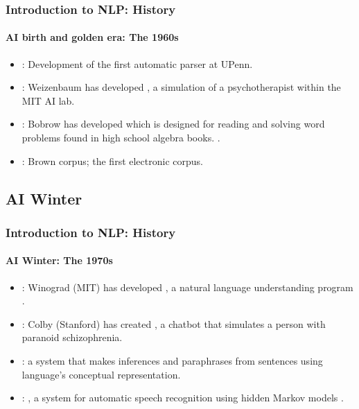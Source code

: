 \documentclass[xcolor=table]{beamer}
\begin{document}
\begin{frame}
\frametitle{Introduction to NLP: History}
\framesubtitle{AI birth and golden era: The 1960s}

\begin{itemize}
	\item {}: Development of the first automatic parser at UPenn. \cite{1961-joshi,1962-harris} 
	\item {}: Weizenbaum has developed , a simulation of a psychotherapist within the MIT AI lab.
	\item {}: Bobrow has developed  which is designed for reading and solving word problems found in high school algebra books. \cite{1964-bobrow}.
	\item {}: Brown corpus; the first electronic corpus.
\end{itemize}

\end{frame}

\subsection{AI Winter}

\begin{frame}
\frametitle{Introduction to NLP: History}
\framesubtitle{AI Winter: The 1970s}

\begin{itemize}
	\item {}: Winograd (MIT) has developed , a natural language understanding program \cite{1971-winograd}.
	\item {}: Colby (Stanford) has created , a chatbot that simulates a person with paranoid schizophrenia.
	\item {}:  a system that makes inferences and paraphrases from sentences using language's conceptual representation.
	\item {}: , a system for automatic speech recognition using hidden Markov models \cite{1975-baker}.
\end{itemize}

\end{frame}
\end{document}
